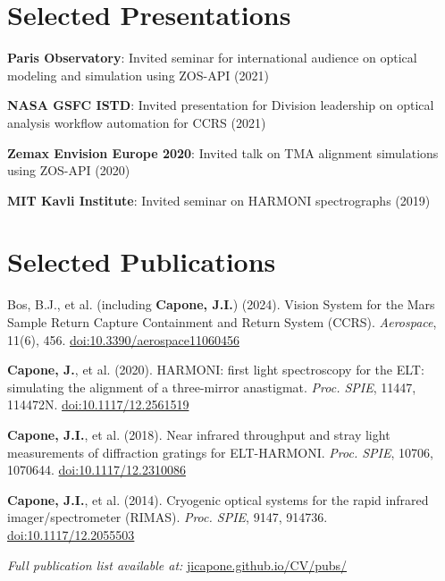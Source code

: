 \documentclass[letterpaper,11pt]{article}
\begin{document}
\section{Selected Presentations}
\begin{itemize}[leftmargin=0.15in, label={}, noitemsep, topsep=0pt]
    \small{
        \item{\textbf{Paris Observatory}{: Invited seminar for international audience on optical modeling and simulation using ZOS-API (2021)}}
        \item{\textbf{NASA GSFC ISTD}{: Invited presentation for Division leadership on optical analysis workflow automation for CCRS (2021)}}
        \item{\textbf{Zemax Envision Europe 2020}{: Invited talk on TMA alignment simulations using ZOS-API (2020)}}
        \item{\textbf{MIT Kavli Institute}{: Invited seminar on HARMONI spectrographs (2019)}}
    }
\end{itemize}

\section{Selected Publications}
\begin{itemize}[leftmargin=0.15in, label={}, noitemsep, topsep=0pt]
    \small{
        \item{Bos, B.J., et al. (including \textbf{Capone, J.I.}) (2024). Vision System for the Mars Sample Return Capture Containment and Return System (CCRS). \textit{Aerospace}, 11(6), 456. \href{https://doi.org/10.3390/aerospace11060456}{doi:10.3390/aerospace11060456}}
        \item{\textbf{Capone, J.}, et al. (2020). HARMONI: first light spectroscopy for the ELT: simulating the alignment of a three-mirror anastigmat. \textit{Proc. SPIE}, 11447, 114472N. \href{https://doi.org/10.1117/12.2561519}{doi:10.1117/12.2561519}}
        \item{\textbf{Capone, J.I.}, et al. (2018). Near infrared throughput and stray light measurements of diffraction gratings for ELT-HARMONI. \textit{Proc. SPIE}, 10706, 1070644. \href{https://doi.org/10.1117/12.2310086}{doi:10.1117/12.2310086}}
        \item{\textbf{Capone, J.I.}, et al. (2014). Cryogenic optical systems for the rapid infrared imager/spectrometer (RIMAS). \textit{Proc. SPIE}, 9147, 914736. \href{https://doi.org/10.1117/12.2055503}{doi:10.1117/12.2055503}}
        \item{\textit{Full publication list available at:} \href{https://jicapone.github.io/CV/pubs/}{jicapone.github.io/CV/pubs/}}
    }
\end{itemize}
\end{document}
